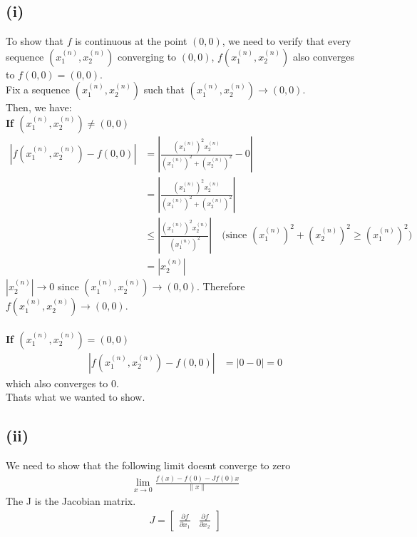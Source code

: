 \documentclass{article}
\begin{document}
\subsection*{(i)}
To show that \( f \) is continuous at the point \( (0, 0) \), we need to verify that every sequence \( (x_1^{(n)}, x_2^{(n)}) \) converging to \( (0, 0) \), \(f(x_1^{(n)}, x_2^{(n)})\)
also converges to \( f(0, 0) = (0, 0) \). \\
Fix a sequence \( (x_1^{(n)}, x_2^{(n)}) \) such that \( (x_1^{(n)}, x_2^{(n)}) \rightarrow (0, 0) \). \\
Then, we have: \\
\textbf{If \( (x_1^{(n)}, x_2^{(n)}) \neq (0, 0)\)}
\begin{align*}
   |f(x_1^{(n)}, x_2^{(n)}) - f(0, 0)| &= \left| \frac{(x_1^{(n)})^2 x_2^{(n)}}{(x_1^{(n)})^2 + (x_2^{(n)})^2} - 0 \right| \\
   &= \left| \frac{(x_1^{(n)})^2 x_2^{(n)}}{(x_1^{(n)})^2 + (x_2^{(n)})^2} \right| \\
   &\leq \left| \frac{(x_1^{(n)})^2 x_2^{(n)}}{(x_1^{(n)})^2} \right| \quad \text{(since } (x_1^{(n)})^2 + (x_2^{(n)})^2 \geq (x_1^{(n)})^2 \text{)} \\
   &= |x_2^{(n)}|
\end{align*}
\( |x_2^{(n)}| \to 0 \) since \( (x_1^{(n)}, x_2^{(n)}) \to (0, 0) \). Therefore \( f(x_1^{(n)}, x_2^{(n)}) \to (0, 0) \). \\
\\
\textbf{If \( (x_1^{(n)}, x_2^{(n)}) = (0, 0)\)}
\begin{align*}
   |f(x_1^{(n)}, x_2^{(n)}) - f(0, 0)| &= |0 - 0| = 0
\end{align*}
which also converges to \( 0 \). \\
Thats what we wanted to show.

\subsection*{(ii)}
We need to show that the following limit doesnt converge to zero
\begin{align*}
   \lim_{x \to 0} \frac{f(x) - f(0) - Jf(0)x}{\|x\|}
\end{align*}
The J is the Jacobian matrix. \\
\begin{align*}
   J = \begin{bmatrix}
      \frac{\partial f}{\partial x_1} & \frac{\partial f}{\partial x_2}
   \end{bmatrix}
\end{align*}
\end{document}
